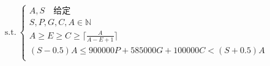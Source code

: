 \documentclass[preview]{standalone}
\begin{document}
\begin{align*}
\text{s.t.}~\begin{cases}A, S \quad \text{给定} \\S, P, G, C, A \in \mathbb{N} \\A \geq E \geq C \geq \lceil \frac{A}{A - E + 1} \rceil \\(S - 0.5)A \leq 900000 P + 585000 G + 100000 C < (S + 0.5)A \\\end{cases}
\end{align*}
\end{document}
